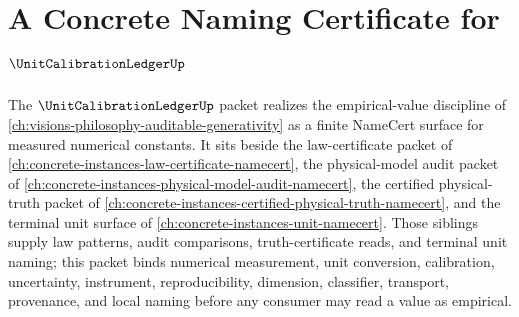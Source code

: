 \chapter{A Concrete Naming Certificate for $\UnitCalibrationLedgerUp$}
\label{ch:concrete-instances-unit-calibration-ledger-namecert}

The $\UnitCalibrationLedgerUp$ packet realizes the empirical-value discipline of \autoref{ch:visions-philosophy-auditable-generativity} as a finite NameCert surface for measured numerical constants. It sits beside the law-certificate packet of \autoref{ch:concrete-instances-law-certificate-namecert}, the physical-model audit packet of \autoref{ch:concrete-instances-physical-model-audit-namecert}, the certified physical-truth packet of \autoref{ch:concrete-instances-certified-physical-truth-namecert}, and the terminal unit surface of \autoref{ch:concrete-instances-unit-namecert}. Those siblings supply law patterns, audit comparisons, truth-certificate reads, and terminal unit naming; this packet binds numerical measurement, unit conversion, calibration, uncertainty, instrument, reproducibility, dimension, classifier, transport, provenance, and local naming before any consumer may read a value as empirical.

